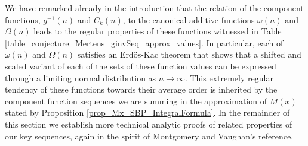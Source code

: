 \documentclass[11pt,reqno,a4letter]{article}
\numberwithin{figure}{section}
\numberwithin{table}{section}
\theoremstyle{plain}
\numberwithin{theorem}{section}
\theoremstyle{definition}
\begin{document}
We have remarked already in the introduction that the relation of the component 
functions, $g^{-1}(n)$ and $C_k(n)$, to the canonical additive functions 
$\omega(n)$ and $\Omega(n)$ leads to the regular properties of these functions 
witnessed in Table \ref{table_conjecture_Mertens_ginvSeq_approx_values}. 
In particular, each of $\omega(n)$ and $\Omega(n)$ satisfies 
an Erd\"os-Kac theorem that shows that a shifted and scaled variant of each 
of the sets of these function values can be expressed through a 
limiting normal distribution as $n \rightarrow \infty$. This extremely regular 
tendency of these functions towards their average order is inherited by the component 
function sequences we are summing in the approximation of $M(x)$ stated by 
Proposition \ref{prop_Mx_SBP_IntegralFormula}. 
In the remainder of this section we establish more technical analytic proofs of 
related properties of our key sequences, again in the spirit of 
Montgomery and Vaughan's reference. 
\end{document}
